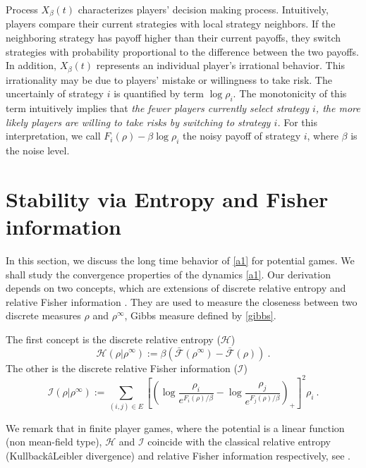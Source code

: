 \documentclass[11pt,reqno]{amsart}
\begin{document}
Process $X_{\beta}(t)$ characterizes players' decision making process. Intuitively,
players compare their current strategies with local
strategy neighbors. If the neighboring strategy has payoff higher than their current payoffs, they switch strategies with probability proportional to the difference between the two payoffs. In addition, $X_\beta(t)$ represents an individual player's irrational behavior. This irrationality may be due to players' mistake or willingness to
take risk. The uncertainly of strategy $i$ is quantified by term
$\log\rho_{i}$. The monotonicity of this term intuitively implies that {\em the fewer
players currently select strategy $i$, the more likely players are willing to
take risks by switching to strategy $i$.} For this interpretation,
we call $F_{i}(\rho)-\beta\log\rho_{i}$ the noisy payoff of strategy $i$, where $\beta$ is the noise level.





\section{Stability via Entropy and Fisher information}
In this section, we discuss the long time behavior of \eqref{a1} for potential games. We shall study the convergence properties of the
dynamics \eqref{a1}. Our derivation depends on two concepts, which are extensions of discrete relative entropy and relative Fisher information \cite{convergence}. They are used to measure the closeness between two discrete measures $\rho$ and $\rho^\infty$, Gibbs measure defined by \eqref{gibbs}.

The first concept is the discrete relative entropy ($\mathcal{H}$)
\begin{equation*}
\mathcal{H}(\rho|\rho^\infty):=\beta(\mathcal{\bar F}(\rho^\infty)-\mathcal{\bar F}(\rho))\ .
\end{equation*}
The other is the discrete relative Fisher information ($\mathcal{I}$)
\begin{equation*}
\mathcal{I}(\rho|\rho^\infty):=\sum_{(i,j)\in E}[(\log\frac{\rho_i}{e^{F_i(\rho)/\beta}}-\log\frac{\rho_j}{e^{F_j(\rho)/\beta}})_+]^2\rho_i\ .
\end{equation*} 

We remark that in finite player games, where the potential is a linear function (non mean-field type), $\mathcal{H}$ and $\mathcal{I}$ coincide with the classical relative entropy (KullbackâLeibler divergence) and relative Fisher information respectively, see \cite{li-finite, li-thesis}. 
\end{document}
